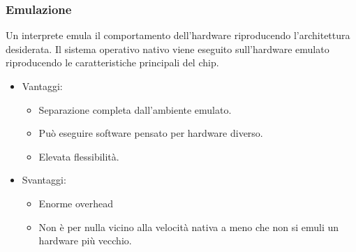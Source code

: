\documentclass{article}
\begin{document}
		\subsubsection{Emulazione}
		Un interprete emula il comportamento dell'hardware riproducendo l'architettura desiderata. Il sistema operativo nativo viene eseguito sull'hardware emulato riproducendo le caratteristiche principali del chip. 
		\begin{itemize}
		    \item Vantaggi:
		    \begin{itemize}
		        \item Separazione completa dall'ambiente emulato.
		        \item Può eseguire software pensato per hardware diverso.
		        \item Elevata flessibilità.
		    \end{itemize}
		    \item Svantaggi:
		    \begin{itemize}
		        \item Enorme overhead
		        \item Non è per nulla vicino alla velocità nativa a meno che non si emuli un hardware più vecchio.
		    \end{itemize}
		\end{itemize}
		
\end{document}
